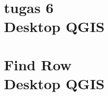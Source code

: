 \documentclass{WileySix}
\begin{document}
\chapter[tugas 6]
{tugas 6\\ Desktop QGIS}


\chapter[findrow]
{Find Row\\ Desktop QGIS}









\printindex
\end{document}
